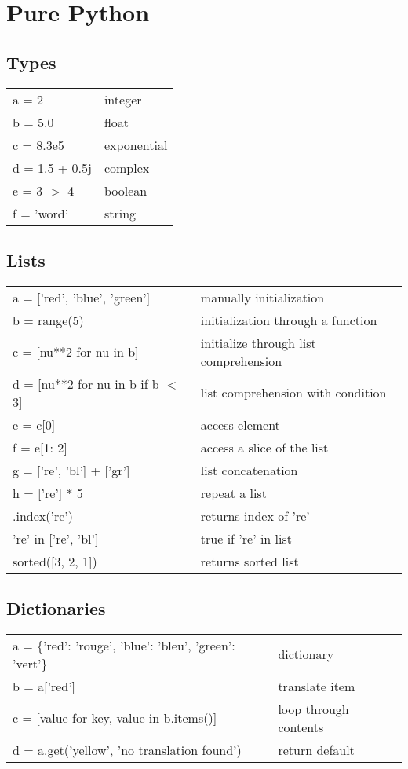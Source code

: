 \documentclass[10pt, a4paper, twocolumn]{article}
\begin{document}
\footnotesize
\section*{Pure Python}
\subsection*{Types}
\begin{tabular}{ p{} p{} }
 a = 2 & integer\\
 b = 5.0 & float\\
 c = 8.3e5 & exponential\\
 d = 1.5 + 0.5j & complex\\
 e = 3 $>$ 4 & boolean\\
 f = 'word' & string\\
\end{tabular}

\subsection*{Lists}
\begin{tabular}{ p{} p{} }
 a = ['red', 'blue', 'green'] & manually initialization\\
 b = range(5) & initialization through a function\\
 c = [nu**2 for nu in b] & initialize through list comprehension\\
 d = [nu**2 for nu in b if b $<$ 3] & list comprehension with condition\\
                        e = c[0] & access element\\
 f = e[1: 2] & access a slice of the list\\
 g = ['re', 'bl'] + ['gr'] & list concatenation\\
 h = ['re'] * 5 & repeat a list\\[1pt]
['re', 'bl'].index('re') & returns index of 're'\\
    're' in ['re', 'bl'] & true if 're' in list\\
  sorted([3, 2, 1]) & returns sorted list\\
\end{tabular}

\subsection*{Dictionaries}
\begin{tabular}{ p{} p{} }
 a = \{'red': 'rouge', 'blue': 'bleu', 'green': 'vert'\} & dictionary\\
                                            b = a['red'] & translate item\\
                 c = [value for key, value in b.items()] & loop through contents\\
             d = a.get('yellow', 'no translation found') & return default\\
\end{tabular}
\end{document}
